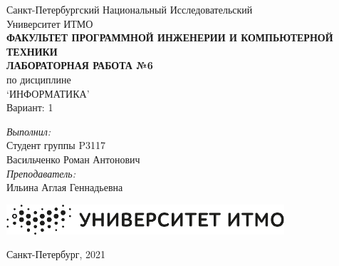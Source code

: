 \documentclass[main.tex]{subfiles}
\begin{document}
\begin{center}
Санкт-Петербургский Национальный Исследовательский\\
Университет ИТМО\\
\hfill \break
\textbf{ФАКУЛЬТЕТ ПРОГРАММНОЙ ИНЖЕНЕРИИ И КОМПЬЮТЕРНОЙ ТЕХНИКИ}\\
\vspace{2.5cm}
\large{\textbf{ЛАБОРАТОРНАЯ РАБОТА №6}}\\
по дисциплине\\
\large{`ИНФОРМАТИКА'}\\
\hfill \break
Вариант: 1\\
\end{center}

\vspace{8cm}
 
\begin{flushright}
\textit{Выполнил:}\\
Студент группы P3117\\
Васильченко Роман Антонович\\
\textit{Преподаватель:}\\
Ильина Аглая Геннадьевна\\
\end{flushright}
 
\vfill

\begin{center}
\includegraphics[scale=0.5]{itmo}
\end{center}
\begin{center} Санкт-Петербург, 2021 \end{center}

\thispagestyle{empty}
\newpage
\end{document}
